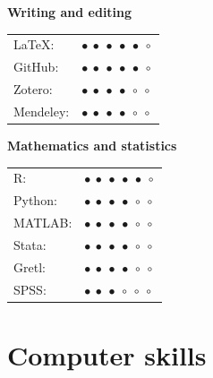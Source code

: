 \documentclass[11pt,a4paper,sans]{moderncv} %
\begin{document}
\large \textbf{Writing and editing}

\vspace{6pt}

\begin{tabular}{l l}
\LaTeX:     & {\LARGE$\bullet\ \bullet\ \bullet\ \bullet\ \bullet\ \circ$} \\
GitHub:     & {\LARGE$\bullet\ \bullet\ \bullet\ \bullet\ \bullet\ \circ$} \\
Zotero:     & {\LARGE$\bullet\ \bullet\ \bullet\ \bullet\ \circ\ \circ$} \\
Mendeley:   & {\LARGE$\bullet\ \bullet\ \bullet\ \bullet\ \circ\ \circ$} \\
\end{tabular}

\vspace{12pt}

\large \textbf{Mathematics and statistics}

\vspace{6pt}

\begin{tabular}{l l}
R:          & {\LARGE$\bullet\ \bullet\ \bullet\ \bullet\ \bullet\ \circ$} \\
Python:     & {\LARGE$\bullet\ \bullet\ \bullet\ \bullet\ \circ\ \circ$} \\
MATLAB:     & {\LARGE$\bullet\ \bullet\ \bullet\ \bullet\ \circ\ \circ$} \\
Stata:      & {\LARGE$\bullet\ \bullet\ \bullet\ \bullet\ \circ\ \circ$} \\
Gretl:      & {\LARGE$\bullet\ \bullet\ \bullet\ \bullet\ \circ\ \circ$} \\
SPSS:       & {\LARGE$\bullet\ \bullet\ \bullet\ \circ\ \circ\ \circ$} \\
\end{tabular}




\section{\textbf{Computer skills}}

\vspace{6pt}

\end{document}
